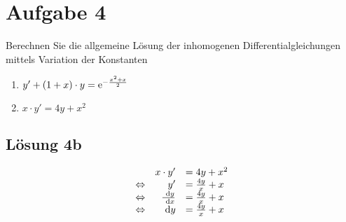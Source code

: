 \documentclass[main.tex]{subfiles}
\begin{document}
\section{Aufgabe 4}
Berechnen Sie die allgemeine Lösung der inhomogenen Differentialgleichungen mittels Variation der Konstanten
\begin{enumerate}
    \item $y' + (1 + x) \cdot y = \mathrm{e}^{-\frac{x^2+x}{2}}$
    \item $x \cdot y' = 4y + x^2$
\end{enumerate}

\subsection{Lösung 4b}
\begin{equation*}
    \begin{array}{rrl}
                        & x \cdot y' &= 4y + x^2 \\
        \Leftrightarrow & y' &= \frac{4y}{x} + x \\
        \Leftrightarrow & \frac{~\mathrm{d}y}{~\mathrm{d}x} &= \frac{4y}{x} + x \\
        \Leftrightarrow & ~\mathrm{d}y &= \frac{4y}{x} + x \\
    \end{array}
\end{equation*}
\end{document}
